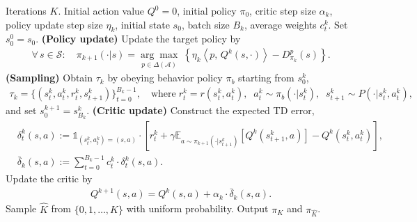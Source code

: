 \documentclass[10pt]{article}
\newcommand{\calA}{\mathcal{A}}
\newcommand{\calS}{\mathcal{S}}
\newcommand{\E}{\mathbb{E}}
\newcommand{\ls}{\left}
\newcommand{\rs}{\right}
\theoremstyle{plain}
\theoremstyle{definition}
\begin{document}
\begin{algorithm}[t!]
    \small
    \caption{Expected TD-PMD with Off-Policy Markov Data}
    \label{alg:Expected-TD-AC-PMD}
\begin{algorithmic}
     Iterations $K$. Initial action value $Q^0=0$, initial policy $\pi_0$, critic step size $\alpha_k$, policy update step size $\eta_k$, initial state $s_0$, batch size $B_k$, average weights $c^k_t$.
    \STATE Set $s_0^0 = s_0$.
    \STATE \textbf{(Policy update)} Update the target policy by
    \begin{align*}
        \forall\, s\in\calS: \quad \pi_{k+1}(\cdot|s) = \underset{p\in\Delta(\calA)}{\arg\max} \; \ls\{ \eta_k \ls\langle p ,\, Q^k(s,\cdot) \rs\rangle - D^p_{\pi_k}(s) \rs\}.
    \end{align*}
    \STATE \textbf{(Sampling)} Obtain $\tau_k$ by obeying behavior policy $\pi_b$ starting from $s_0^k$,
    \begin{align*}
        \tau_k = \{ (s_t^k, a_t^k, r^k_t, s_{t+1}^k) \}_{t=0}^{B_k-1}, \quad \mbox{where} \; r^k_t = r(s^k_t, a^k_t), \;\; a^k_t \sim \pi_b(\cdot|s_t^k), \;\; s^k_{t+1} \sim P(\cdot| s_t^k, a_t^k),
    \end{align*}
    and set $s_0^{k+1} = s_{B_k}^k$.
    \STATE \textbf{(Critic update)} Construct the expected TD error,
    \begin{align*}
        &\delta_t^k(s,a) := \mathds{1}_{(s^k_t,a^k_t)=(s,a) } \cdot\ls[r_t^k + \gamma\E_{a\sim\pi_{k+1}(\cdot|s_{t+1}^k)} \ls[Q^k(s_{t+1}^k, a)\rs] - Q^k(s^k_t, a^k_t)\rs], \\
        &\bar\delta_k(s,a) := {\sum_{t=0}^{B_k-1} c_t^k \cdot \delta_t^k(s,a)}.
    \end{align*}
    \STATE Update the critic by
    \begin{align*}
        Q^{k+1}(s,a) = Q^k(s,a) + \alpha_k \cdot \bar\delta_k(s,a).
    \end{align*}
    \ENDFOR
    \STATE Sample $\hat K$ from $\{ 0, 1, \dots, K \}$ with uniform probability.
    \STATE Output $\pi_K$ and $\pi_{\hat K}$.
\end{algorithmic}
\end{algorithm}
\end{document}
